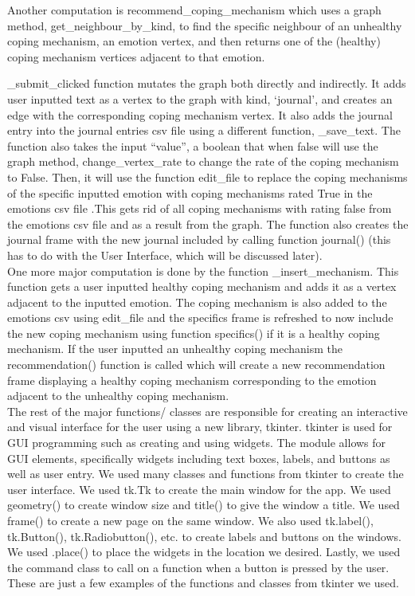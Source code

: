 \documentclass{article}
\begin{document}
    Another computation is recommend\_coping\_mechanism which uses a graph method, get\_neighbour\_by\_kind, to find the specific neighbour of an unhealthy coping mechanism, an emotion vertex, and then returns one of the (healthy) coping mechanism vertices adjacent to that emotion.

    \_submit\_clicked function mutates the graph both directly and indirectly. It adds user inputted text as a vertex to the graph with kind, ‘journal’, and creates an edge with the corresponding coping mechanism vertex. It also adds the journal entry into the journal entries csv file using a different function, \_save\_text. The function also takes the input “value”, a boolean that when false will use the graph method, change\_vertex\_rate to change the rate of the coping mechanism to False. Then, it will use the function edit\_file to replace the coping mechanisms of the specific inputted emotion with coping mechanisms rated True in the emotions csv file .This gets rid of all coping mechanisms with rating false from the emotions csv file and as a result from the graph. The function also creates the journal frame with the new journal included by calling function journal() (this has to do with the User Interface, which will be discussed later). \\

    One more major computation is done by the function \_insert\_mechanism. This function gets a user inputted healthy coping mechanism and adds it as a vertex adjacent to the inputted emotion. The coping mechanism is also added to the emotions csv using edit\_file  and the specifics frame is refreshed to now include the new coping mechanism using function specifics() if it is a healthy coping mechanism. If the user inputted an unhealthy coping mechanism the recommendation() function is called which will create a new recommendation frame displaying a healthy coping mechanism corresponding to the emotion adjacent to the unhealthy coping mechanism. \\


    The rest of the major functions/ classes are responsible for creating an interactive and visual interface for the user using a new library, tkinter. tkinter is used for GUI programming such as creating and using widgets. The module allows for GUI elements, specifically widgets including text boxes, labels, and buttons as well as user entry. We used many classes and functions from tkinter to create the user interface. We used tk.Tk to create the main window for the app. We used geometry() to create window size and title() to give the window a title. We used frame() to create a new page on the same window. We also used tk.label(), tk.Button(), tk.Radiobutton(), etc. to create labels and buttons on the windows. We used .place() to place the widgets in the location we desired. Lastly, we used the command class to call on a function when a button is pressed by the user. These are just a few examples of the functions and classes from tkinter we used.
\end{document}

